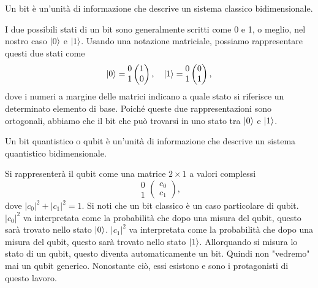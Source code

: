 \begin{definition}
    Un bit è un'unità di informazione che descrive un sistema classico 
    bidimensionale. 
\end{definition}
I due possibili stati di un bit sono generalmente scritti come 
0 e 1, o meglio, nel nostro caso $\ket{0}$ e $\ket{1}$. 
Usando una notazione matriciale, possiamo rappresentare questi due 
stati come 
\begin{equation}
    \ket{0} = \begin{matrix}
        0 \\ 1
    \end{matrix}
    \begin{pmatrix}
        1 \\ 0
    \end{pmatrix}, \quad
    \ket{1} = \begin{matrix}
        0 \\ 1
    \end{matrix}
    \begin{pmatrix}
        0 \\ 1
    \end{pmatrix},
\end{equation}
dove i numeri a margine delle matrici indicano a quale stato si 
riferisce un determinato elemento di base. Poiché queste due 
rappresentazioni sono ortogonali, abbiamo che il bit che 
può trovarsi in uno stato tra $\ket{0}$ e $\ket{1}$. 

\begin{definition}
    Un bit quantistico o qubit è un'unità di informazione che descrive 
    un sistema quantistico bidimensionale. 
\end{definition}
Si rappresenterà il qubit come una matrice $2\times1$ a valori complessi 
\begin{equation}
    \begin{matrix}
        0 \\ 1
    \end{matrix}
    \begin{pmatrix}
        c_0 \\ c_1
    \end{pmatrix},
\end{equation}
dove $|c_0|^2 + |c_1|^2 = 1$. Si noti che un bit classico è un caso particolare 
di qubit. $|c_0|^2$ va interpretata come la probabilità che dopo una misura del 
qubit, questo sarà trovato nello stato $\ket{0}$. $|c_1|^2$ va interpretata come 
la probabilità che dopo una misura del qubit, questo sarà trovato nello stato 
$\ket{1}$. Allorquando si misura lo stato di un qubit, questo diventa automaticamente 
un bit. Quindi non "vedremo" mai un qubit generico. Nonostante ciò, essi esistono 
e sono i protagonisti di questo lavoro. 

